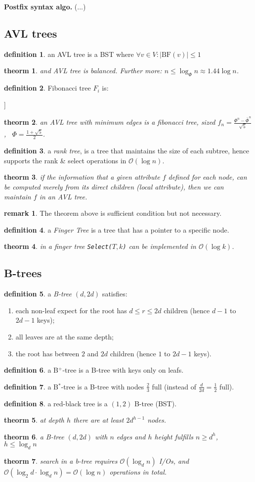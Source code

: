 \documentclass[]{article}
\newcommand\oc    {\mathcal{O}}
\newcommand\co        {\colon}
\newcommand\logn      {\log n}
\newcommand\sof[1]    {\left | #1 \right |}
\newtheorem{Theorem}{theorm}
\theoremstyle{definition}
\newtheorem{Definition}{definition}
\newtheorem{Remark}{remark}
\newcommand\theo  [1] {\begin{Theorem}#1\end{Theorem}}
\newcommand\defi  [1] {\begin{Definition}#1\end{Definition}}
\begin{document}
\begin{multicols}{4}
		\textbf{Postfix syntax algo. }(...) %
		
		\subsection{AVL trees}
		\defi{an AVL tree is a BST where $\forall v \in V \co \sof{\mathrm{BF}(v)} \le 1$}
		\theo{and AVL tree is balanced. Further more: $n \le \log_{\Phi}n \approx 1.44\logn$. }
		\defi{Fibonacci tree $F_i$ is: \\ \begin{center}
				\begin{forest}
					[$F_i$ [$F_{i -1}$] [$F_{i - 2}$]]
				\end{forest}
		\end{center}}
		\theo{an AVL tree with minimum edges is a fibonacci tree, sized $f_n = \frac{\Phi^n - \bar \Phi^n}{\sqrt 5}$, \ $\Phi = \frac{1 + \sqrt 5}{2}$. }
		
		
		\defi{a \textit{rank tree}, is a tree that maintains the size of each subtree, hence supports the rank \& select operations in $\oc(\logn)$. }
		
		\theo{if the information that a given attribute $f$ defined for each node, can be computed merely from its direct children (\textit{local attribute}), then we can maintain $f$ in an AVL tree. }
		\begin{Remark}
			The theorem above is sufficient condition but not necessary. 
		\end{Remark}
		
		\defi{a \textit{Finger Tree} is a tree that has a pointer to a specific node. }
		\theo{in a finger tree \texttt{Select($T, k$)} can be implemented in $\oc(\log k)$. }
		

		\subsection{B-trees}		
		\defi{a \textit{B-tree $(d, 2d)$} satisfies: 
		\begin{enumerate}
			\item each non-leaf expect for the root has $d \le r \le 2d$ children (hence $d - 1$ to $2d - 1$ keys);
			\item all leaves are at the same depth;
			\item the root has between $2$ and $2d$ children (hence $1$ to $2d - 1$ keys). 
		\end{enumerate}}
		\defi{a B$^{\text{+}}$-tree is a B-tree with keys only on leafs. }
		\defi{a B$^{\text{*}}$-tree is a B-tree with nodes $\frac{2}{3}$ full (instead of $\frac{d}{2d} = \frac{1}{2}$ full). }
		\defi{a red-black tree is a $(1, 2)$ B-tree (BST). }
		\theo{at depth $h$ there are at least $2d^{h - 1}$ nodes. }
		\theo{a B-tree $(d, 2d)$ with $n$ edges and $h$ height fulfills $n \ge d^{h}$, $h \le \log_{d} n$}
		\theo{search in a b-tree requires $\oc(\log_dn)$ I/Os, and $\oc(\log_2 d \cdot \log_d n) = \oc(\logn)$ operations in total. }
		

\end{multicols}
\end{document}
